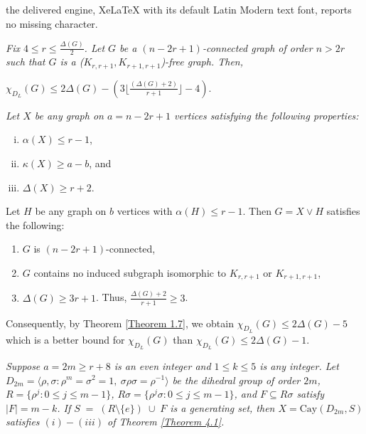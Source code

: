 \documentclass[10pt,a4paper]{amsart}
\begin{document}
the delivered engine, XeLaTeX with its default Latin Modern text font, reports no missing character.
\begin{thm}\label{Theorem 1.7}{\em Fix $4\leq r\leq \frac{\Delta(G)}{2}$. Let $G$ be a $(n-2r+1)$-connected graph of order $n>2r$ such that
$G$ is a ($K_{r,r+1}, K_{r+1,r+1}$)-free graph.
Then, 
\begin{center}
$\chi_{D_{L}}(G)\leq 2\Delta(G)-  (3\lfloor\frac{(\Delta(G)+2)}{r+1}\rfloor-4)$.
\end{center}
}
\end{thm}

\begin{thm}\label{Theorem 4.1}
{\em Let $X$ be any graph on $a=n-2r+1$ vertices satisfying the following properties:
\begin{enumerate}[(i)]
    \item $\alpha(X)\le r-1$, 
    \item $\kappa(X)\ge a-b$, and
    \item $\Delta(X)\ge r+2$.
\end{enumerate}

Let $H$ be any graph on $b$ vertices with $\alpha(H)\le r-1$. Then $G=X\vee H$ satisfies the following:
\begin{enumerate}
    \item $G$ is $(n-2r+1)$-connected,
    \item $G$ contains no induced subgraph isomorphic to $K_{r,r+1}$ or $K_{r+1,r+1}$,
    \item $\Delta(G)\ge 3r+1$. Thus, $\displaystyle \frac{\Delta(G) + 2}{r + 1} \ge 3$.
\end{enumerate}
Consequently, by Theorem \ref{Theorem 1.7}, we obtain $\chi_{D_{L}}(G)\leq 2\Delta(G)-5$ which is a better bound for $\chi_{D_{L}}(G)$ than $\chi_{D_{L}}(G)\leq 2\Delta(G)-1$.
}
\end{thm}

\begin{prop}\label{Proposition 4.4}
{\em Suppose $a=2m\geq r+8$ is an even integer and $1\leq k\leq 5$ is any integer. 
Let $D_{2m}=\langle \rho,\sigma : \rho^m=\sigma^2=1,\ \sigma\rho\sigma=\rho^{-1}\rangle$ 
be the dihedral group of order $2m$, $R=\{\rho^j:0\le j\le m-1\}$, $R\sigma=\{\rho^j\sigma:0\le j\le m-1\}$, and $F\subseteq R\sigma$ satisfy $|F|=m-k$.
If $S \;=\; (R\setminus\{e\}) \;\cup\; F$ is a generating set,
then $X=\mathrm{Cay}(D_{2m},S)$ satisfies $(i)-(iii)$ of Theorem \ref{Theorem 4.1}.}
\end{prop}
\end{document}
